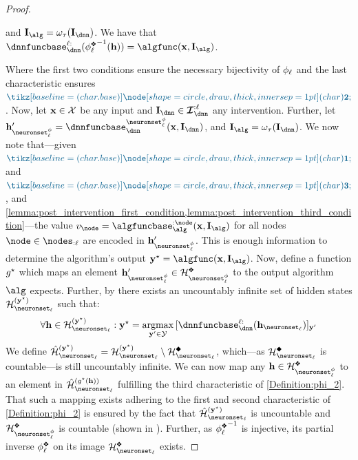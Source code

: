 \begin{proof}
\begin{definition}
\begin{enumerate}[topsep=0pt]
            and $\interventionsalg = \interventionmap(\interventionsdnn)$.
            We have that $\dnnfunclayer{\layer:}({\causalmap_{\layer}^{\inter}}^{-1}(\hiddenstates)) = \algfunc(\bx, \interventionsalg)$.
        \end{enumerate}
    \end{definition}
    Where the first two conditions ensure the necessary bijectivity of $\phi_{\ell}$ and the last characteristic ensures $\inductioncircle{2}$.
    Now, let $\mathbf{x} \in \mathcal{X}$ be  any input and $\interventions_\dnn\in\interventionsset_{\dnn}^{:\layer}$ any intervention.
    Further, let $\hiddenstates'_{\neuronset^{\causalmap}_{\layer}} = \dnnfunclayer{\neuronset^{\causalmap}_{\layer}}(\bx, \interventionsdnn)$, 
    and $\interventionsalg = \interventionmap(\interventionsdnn)$.
    We now note that---given $\inductioncircle{1}$ and $\inductioncircle{3}$,  and \cref{lemma:post_intervention_first_condition,lemma:post_intervention_third_condition}---the value $\nodevalue_{\node} = \algfuncnode{:\node}(\bx, \interventionsalg)$
    for all nodes $\node\in\nodes_{:\layer}$ are encoded in $\hiddenstates'_{\neuronset^{\causalmap}_{\layer}}$.
    This is enough information to determine the algorithm's output $\class = \algfunc(\bx, \interventionsalg)$. 
    Now, define a function $g^{\star}$ which maps an element $\hiddenstates'_{\neuronset^{\causalmap}_{\layer}} \in \AllInpIntTransformedActivationsLayerTwoH{\layer}$ to the output algorithm $\alg$ expects.
    Further, by  there exists an uncountably infinite set of hidden states $\AllActivationsLayerClass$ such that:
    \begin{align}
        \forall\hiddenstates\in\AllActivationsLayerClass: \class=\argmax_{\by'\in \calY}{[\dnnfunclayer{\layer:}(\hiddenstates_{\neuronset_{\layer}})]_{\by'}}
    \end{align} 
    We define $\AllActivationsLayerClassSub=\AllActivationsLayerClass\setminus\AllInpIntActivationsLayer$, which---as $\AllInpIntActivationsLayer$ is countable---is still uncountably infinite.
    We can now map any $\hiddenstates\in\AllInpIntTransformedActivationsLayerTwoH{\layer}$ to an element in $\AllActivationsLayerClassSubH{\layer}{\goutput(\hiddenstates)}$ fulfilling the third characteristic of \cref{Definition:phi_2}. 
    That such a mapping exists adhering to the first and second characteristic of \cref{Definition:phi_2} is ensured by the fact that $\AllActivationsLayerClassSubH{\layer}{\class}$ is uncountable and  $\AllInpIntTransformedActivationsLayerTwoH{\layer}$ is countable (shown in ).
    Further, as ${\causalmap_\layer^{\inter}}^{-1}$ is injective, its partial inverse ${\causalmap_\layer^{\inter}}$ on its image $\AllInpIntActivationsLayerTwoH{\layer}$ exists.
    

\end{proof}
